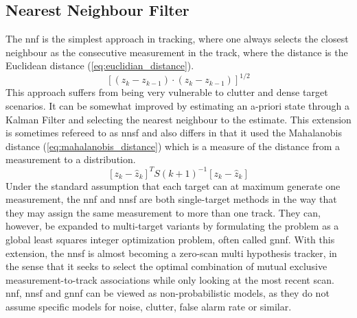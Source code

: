 \subsection{Nearest Neighbour Filter}
\label{sec:nn}
The \gls{nnf} is the simplest approach in tracking, where one always selects the closest neighbour as the consecutive \gls{measurement} in the track, where the distance is the Euclidean distance (\ref{eq:euclidian_distance}).
\begin{equation}
\left[ (z_k-z_{k-1}) \cdot (z_k-z_{k-1}) \right]^{1/2}
\label{eq:euclidian_distance}
\end{equation}
This approach suffers from being very vulnerable to clutter and dense \gls{target} scenarios. It can be somewhat improved by estimating an a-priori state through a Kalman Filter and selecting the nearest neighbour to the estimate. This extension is sometimes refereed to as \gls{nnsf} \cite{Bar-Shalom1998} and also differs in that it used the Mahalanobis distance (\ref{eq:mahalanobis_distance}) which is a measure of the distance from a \gls{measurement} to a distribution.
\begin{equation}
\left[ z_k - \hat{z}_{k} \right]^T S(k+1)^{-1} \left[ z_k - \hat{z}_{k} \right]
\label{eq:mahalanobis_distance}
\end{equation}
Under the standard assumption that each \gls{target} can at maximum generate one \gls{measurement}, the \gls{nnf} and \gls{nnsf} are both single-\gls{target} methods in the way that they may assign the same \gls{measurement} to more than one track. They can, however, be expanded to multi-\gls{target} variants by formulating the problem as a global least squares integer optimization problem, often called \gls{gnnf}. With this extension, the \gls{nnsf} is almost becoming a zero-scan multi hypothesis tracker, in the sense that it seeks to select the optimal combination of mutual exclusive measurement-to-track associations while only looking at the most recent \gls{scan}. \gls{nnf}, \gls{nnsf} and \gls{gnnf} can be viewed as non-probabilistic models, as they do not assume specific models for noise, clutter, false alarm rate or similar.

